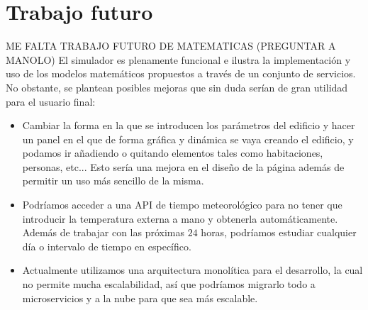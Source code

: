 \section{Trabajo futuro}
ME FALTA TRABAJO FUTURO DE MATEMATICAS (PREGUNTAR A MANOLO)
El simulador es plenamente funcional e ilustra la implementación y uso de los modelos matemáticos propuestos a través de un conjunto de servicios. No obstante, se plantean posibles mejoras que sin duda serían de gran utilidad para el usuario final:
\begin{itemize}
	\item Cambiar la forma en la que se introducen los parámetros del edificio y hacer un panel en el que de forma gráfica y dinámica se vaya creando el edificio, y podamos ir añadiendo o quitando elementos tales como habitaciones, personas, etc... Esto sería una mejora en el diseño de la página además de permitir un uso más sencillo de la misma.
	\item Podríamos acceder a una API de tiempo meteorológico para no tener que introducir la temperatura externa a mano y obtenerla automáticamente. Además de trabajar con las próximas $24$ horas, podríamos estudiar cualquier día o intervalo de tiempo en específico.
	\item Actualmente utilizamos una arquitectura monolítica para el desarrollo, la cual no permite mucha escalabilidad, así que podríamos migrarlo todo a microservicios y a la nube para que sea más escalable.
\end{itemize}
\endinput
